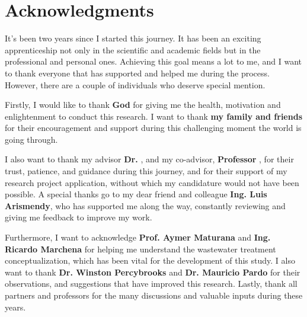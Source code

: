 \chapter*{Acknowledgments}

It’s been two years since I started this journey. It has been an exciting apprenticeship not only in the scientific and academic fields but in the professional and personal ones. Achieving this goal means a lot to me, and I want to thank everyone that has supported and helped me during the process. However, there are a couple of individuals who deserve special mention.

Firstly, I would like to thank \textbf{God} for giving me the health, motivation and enlightenment to conduct this research. I want to thank \textbf{my family and friends} for their encouragement and support during this challenging moment the world is going through.

I also want to thank my advisor \textbf{Dr.} \textbf{\myProfFirstName} \textbf{\myProfLastName}, and my co-advisor, \textbf{Professor} \textbf{\myOtherProfFirstName} \textbf{\myOtherProfLastName}, for their trust, patience, and guidance during this journey, and for their support of my research project application, without which my candidature would not have been possible. A special thanks go to my dear friend and colleague \textbf{Ing. Luis Arismendy}, who has supported me along the way, constantly reviewing and giving me feedback to improve my work.

Furthermore, I want to acknowledge \textbf{Prof. Aymer Maturana} and \textbf{Ing. Ricardo Marchena} for helping me understand the wastewater treatment conceptualization, which has been vital for the development of this study. I also want to thank \textbf{Dr. Winston Percybrooks} and \textbf{Dr. Mauricio Pardo} for their observations, and suggestions that have improved this research. Lastly, thank all partners and professors for the many discussions and valuable inputs during these years. 




